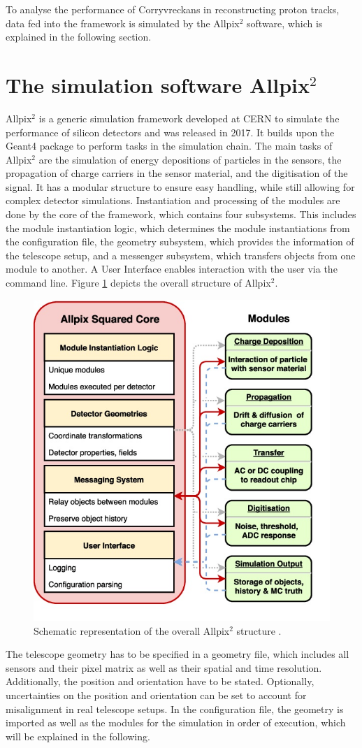 To analyse the performance of Corryvreckans in reconstructing proton tracks, data fed into the framework is simulated by the Allpix$^2$ software,
which is explained in the following section.

\section{The simulation software Allpix$^2$}
Allpix$^2$ is a generic simulation framework developed at CERN to simulate the performance of silicon detectors and was released in 2017.
It builds upon the
Geant4 \cite{geant4} package to perform tasks in the simulation chain. The main tasks of Allpix$^2$ are the simulation of energy depositions of particles
in the sensors, the propagation of charge carriers in the sensor material, and the digitisation of the signal. It has a modular
structure to ensure easy handling, while still allowing for complex detector simulations.
Instantiation and processing of the modules are done by the core of the framework,
which contains four subsystems.
This includes the module instantiation logic, which determines the module instantiations from the configuration file, the
geometry subsystem, which provides the information of the telescope setup, and a messenger subsystem, which transfers objects from one module to another.
A User Interface enables interaction with the user via the command line.
Figure \ref{fig:allpix} depicts the overall structure of Allpix$^2$.

\begin{figure}
  \centering
  \includegraphics[height=0.5\textwidth]{images/allpix.jpg}
  \caption{Schematic representation of the overall Allpix$^2$ structure \cite{fig_allpix}.}
  \label{fig:allpix}
\end{figure}

The telescope geometry has to be specified in a geometry file, which includes all sensors and their pixel matrix as well as their spatial and time
resolution. Additionally,
the position and orientation have to be stated. Optionally, uncertainties on the position and orientation can be set to account for misalignment in real
telescope setups.
In the configuration file, the geometry is imported as well as the modules for the simulation in order of execution, which
will be explained in the following.

